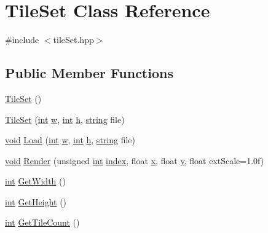 \hypertarget{class_tile_set}{\section{Tile\-Set Class Reference}
\label{class_tile_set}
}


{\ttfamily \#include $<$tile\-Set.\-hpp$>$}

\subsection*{Public Member Functions}
\begin{DoxyCompactItemize}
\item 
\hyperlink{class_tile_set_a10830bfd0dd294b432520391251600ce}{Tile\-Set} ()
\item 
\hyperlink{class_tile_set_af50e6ba8a87fc066d9fbf8a4c78a5a9e}{Tile\-Set} (\hyperlink{_s_d_l__thread_8h_a6a64f9be4433e4de6e2f2f548cf3c08e}{int} \hyperlink{_s_d_l__opengl__glext_8h_a6ee8f168a7ab6785a9bb57c6715dad99}{w}, \hyperlink{_s_d_l__thread_8h_a6a64f9be4433e4de6e2f2f548cf3c08e}{int} \hyperlink{_s_d_l__opengl__glext_8h_afa0fb1b5e976920c0abeff2dca3ed774}{h}, \hyperlink{_s_d_l__opengl__glext_8h_ae84541b4f3d8e1ea24ec0f466a8c568b}{string} file)
\item 
\hyperlink{_s_d_l__opengles2__gl2ext_8h_ae5d8fa23ad07c48bb609509eae494c95}{void} \hyperlink{class_tile_set_a5fcf2b00089d0cf7a9a7a9c42b7597b0}{Load} (\hyperlink{_s_d_l__thread_8h_a6a64f9be4433e4de6e2f2f548cf3c08e}{int} \hyperlink{_s_d_l__opengl__glext_8h_a6ee8f168a7ab6785a9bb57c6715dad99}{w}, \hyperlink{_s_d_l__thread_8h_a6a64f9be4433e4de6e2f2f548cf3c08e}{int} \hyperlink{_s_d_l__opengl__glext_8h_afa0fb1b5e976920c0abeff2dca3ed774}{h}, \hyperlink{_s_d_l__opengl__glext_8h_ae84541b4f3d8e1ea24ec0f466a8c568b}{string} file)
\item 
\hyperlink{_s_d_l__opengles2__gl2ext_8h_ae5d8fa23ad07c48bb609509eae494c95}{void} \hyperlink{class_tile_set_a5f68daa3918624795358fd01c39bd669}{Render} (unsigned \hyperlink{_s_d_l__thread_8h_a6a64f9be4433e4de6e2f2f548cf3c08e}{int} \hyperlink{_s_d_l__opengl__glext_8h_a57f14e05b1900f16a2da82ade47d0c6d}{index}, float \hyperlink{_s_d_l__opengl_8h_ad0e63d0edcdbd3d79554076bf309fd47}{x}, float \hyperlink{_s_d_l__opengl_8h_a1675d9d7bb68e1657ff028643b4037e3}{y}, float ext\-Scale=1.\-0f)
\item 
\hyperlink{_s_d_l__thread_8h_a6a64f9be4433e4de6e2f2f548cf3c08e}{int} \hyperlink{class_tile_set_ac59bfe1ccab2e53eec2c46448a4d4876}{Get\-Width} ()
\item 
\hyperlink{_s_d_l__thread_8h_a6a64f9be4433e4de6e2f2f548cf3c08e}{int} \hyperlink{class_tile_set_acf386c42d0882b653544ad9ff34d88db}{Get\-Height} ()
\item 
\hyperlink{_s_d_l__thread_8h_a6a64f9be4433e4de6e2f2f548cf3c08e}{int} \hyperlink{class_tile_set_add793423cd73315081d65c670a2fa571}{Get\-Tile\-Count} ()
\end{DoxyCompactItemize}


